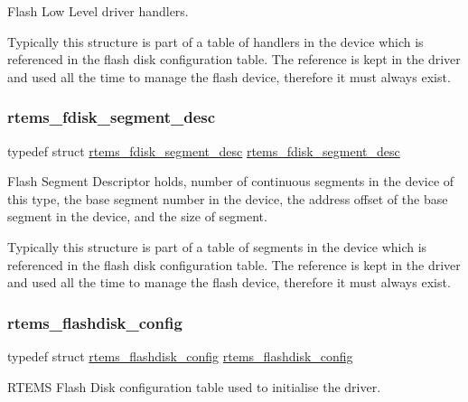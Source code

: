 Flash Low Level driver handlers. 

Typically this structure is part of a table of handlers in the device which is referenced in the flash disk configuration table. The reference is kept in the driver and used all the time to manage the flash device, therefore it must always exist. \mbox{\label{group__RTEMSFDisk_ga0af0a297f5876583c22f099ac54688c7}} 
\subsubsection{\texorpdfstring{rtems\_fdisk\_segment\_desc}{rtems\_fdisk\_segment\_desc}}
{\footnotesize\ttfamily typedef struct \mbox{\hyperlink{structrtems__fdisk__segment__desc}{rtems\+\_\+fdisk\+\_\+segment\+\_\+desc}}  \mbox{\hyperlink{structrtems__fdisk__segment__desc}{rtems\+\_\+fdisk\+\_\+segment\+\_\+desc}}}



Flash Segment Descriptor holds, number of continuous segments in the device of this type, the base segment number in the device, the address offset of the base segment in the device, and the size of segment. 

Typically this structure is part of a table of segments in the device which is referenced in the flash disk configuration table. The reference is kept in the driver and used all the time to manage the flash device, therefore it must always exist. \mbox{\label{group__RTEMSFDisk_ga8d4fff797358538766b3bb13be596811}} 
\subsubsection{\texorpdfstring{rtems\_flashdisk\_config}{rtems\_flashdisk\_config}}
{\footnotesize\ttfamily typedef struct \mbox{\hyperlink{structrtems__flashdisk__config}{rtems\+\_\+flashdisk\+\_\+config}}  \mbox{\hyperlink{structrtems__flashdisk__config}{rtems\+\_\+flashdisk\+\_\+config}}}



R\+T\+E\+MS Flash Disk configuration table used to initialise the driver. 

